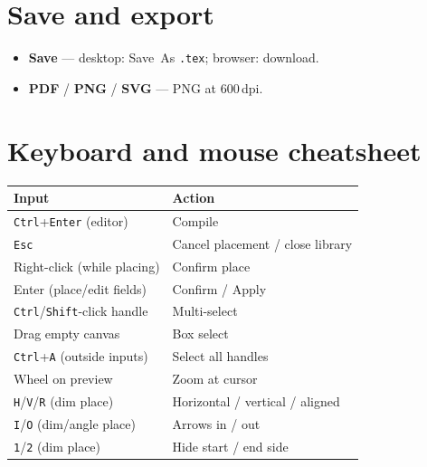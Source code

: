 \documentclass[a4paper]{ltxdoc}
\newcommand{\ui}[1]{\textbf{#1}}
\newcommand{\key}[1]{\texttt{#1}}
\begin{document}
\section{Save and export}

\begin{itemize}[nosep]
  \item \ui{Save} --- desktop: Save~As \texttt{.tex}; browser: download.
  \item \ui{PDF} / \ui{PNG} / \ui{SVG} --- PNG at 600\,dpi.
\end{itemize}

\section{Keyboard and mouse cheatsheet}

\begin{center}
{\small
\begin{tabular}{@{}ll@{}}
\toprule
Input & Action \\
\midrule
\key{Ctrl}+\key{Enter} (editor) & Compile \\
\key{Esc} & Cancel placement / close library \\
Right-click (while placing) & Confirm place \\
Enter (place/edit fields) & Confirm / Apply \\
\key{Ctrl}/\key{Shift}-click handle & Multi-select \\
Drag empty canvas & Box select \\
\key{Ctrl}+\key{A} (outside inputs) & Select all handles \\
Wheel on preview & Zoom at cursor \\
\key{H}/\key{V}/\key{R} (dim place) & Horizontal / vertical / aligned \\
\key{I}/\key{O} (dim/angle place) & Arrows in / out \\
\key{1}/\key{2} (dim place) & Hide start / end side \\
\bottomrule
\end{tabular}}
\end{center}

\end{document}
